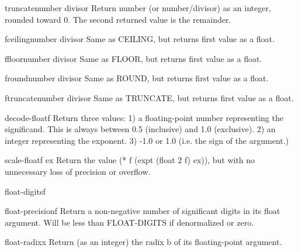 \begin{function}{truncate}{number \op divisor}{}{}
  Return number (or number/divisor) as an integer, rounded toward 0.
  The second returned value is the remainder.
\end{function}

\begin{function}{fceiling}{number \op divisor}{}{}
  Same as CEILING, but returns first value as a float.
\end{function}

\begin{function}{ffloor}{number \op divisor}{}{}
  Same as FLOOR, but returns first value as a float.
\end{function}

\begin{function}{fround}{number \op divisor}{}{}
  Same as ROUND, but returns first value as a float.
\end{function}

\begin{function}{ftruncate}{number \op divisor}{}{}
  Same as TRUNCATE, but returns first value as a float.
\end{function}

\begin{function}{decode-float}{f}{}{}
  Return three values:
   1) a floating-point number representing the significand. This is always
      between 0.5 (inclusive) and 1.0 (exclusive).
   2) an integer representing the exponent.
   3) -1.0 or 1.0 (i.e. the sign of the argument.)
\end{function}

\begin{function}{scale-float}{f ex}{}{}
  Return the value (* f (expt (float 2 f) ex)), but with no unnecessary loss
  of precision or overflow.
\end{function}

\begin{function}{float-digits}{f}{}{}
  
\end{function}

\begin{function}{float-precision}{f}{}{}
  Return a non-negative number of significant digits in its float argument.
  Will be less than FLOAT-DIGITS if denormalized or zero.
\end{function}

\begin{function}{float-radix}{x}{}{}
  Return (as an integer) the radix b of its floating-point argument.
\end{function}


